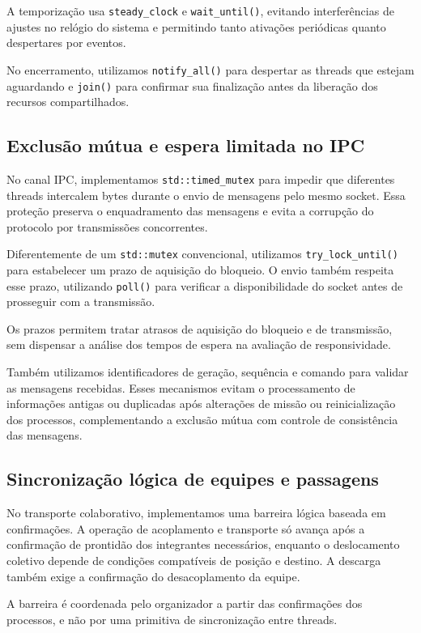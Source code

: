 \documentclass[12pt,a4paper]{article}
\newcommand{\code}[1]{\mbox{\texttt{#1}}}
\begin{document}
A temporização usa \code{steady\_clock} e \code{wait\_until()}, evitando
interferências de ajustes no relógio do sistema e permitindo tanto ativações
periódicas quanto despertares por eventos.

No encerramento, utilizamos \code{notify\_all()} para despertar as threads que
estejam aguardando e \code{join()} para confirmar sua finalização antes da
liberação dos recursos compartilhados.

\subsection{Exclusão mútua e espera limitada no IPC}

No canal IPC, implementamos \code{std::timed\_mutex} para impedir que
diferentes threads intercalem bytes durante o envio de mensagens pelo mesmo
socket. Essa proteção preserva o enquadramento das mensagens e evita a
corrupção do protocolo por transmissões concorrentes.

Diferentemente de um \code{std::mutex} convencional, utilizamos
\code{try\_lock\_until()} para estabelecer um prazo de aquisição do bloqueio. O
envio também respeita esse prazo, utilizando \code{poll()} para verificar a
disponibilidade do socket antes de prosseguir com a transmissão.

Os prazos permitem tratar atrasos de aquisição do bloqueio e de transmissão,
sem dispensar a análise dos tempos de espera na avaliação de responsividade.

Também utilizamos identificadores de geração, sequência e comando para validar
as mensagens recebidas. Esses mecanismos evitam o processamento de informações
antigas ou duplicadas após alterações de missão ou reinicialização dos
processos, complementando a exclusão mútua com controle de consistência das
mensagens.

\subsection{Sincronização lógica de equipes e passagens}

No transporte colaborativo, implementamos uma barreira lógica baseada em
confirmações. A operação de acoplamento e transporte só avança após a
confirmação de prontidão dos integrantes necessários, enquanto o deslocamento
coletivo depende de condições compatíveis de posição e destino. A descarga
também exige a confirmação do desacoplamento da equipe.

A barreira é coordenada pelo organizador a partir das confirmações dos
processos, e não por uma primitiva de sincronização entre threads.
\end{document}
